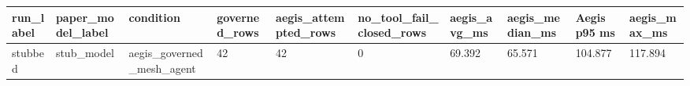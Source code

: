 \begin{tabular}{llllllllll}
 \hline
run\_label & paper\_model\_label & condition & governed\_rows & aegis\_attempted\_rows & no\_tool\_fail\_closed\_rows & aegis\_avg\_ms & aegis\_median\_ms & Aegis p95 ms & aegis\_max\_ms \\
 \hline
stubbed & stub\_model & aegis\_governed\_mesh\_agent & 42 & 42 & 0 & 69.392 & 65.571 & 104.877 & 117.894 \\
 \hline
\end{tabular}
